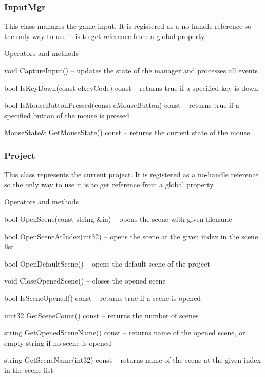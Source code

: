 \subsubsection{InputMgr}

This class manages the game input. It is registered as a no-handle reference so the only way to use it is to get reference from a global property.

\begin{titled-itemize}{Operators and methods}
  \item void CaptureInput() -- updates the state of the manager and processes all events
  \item bool IsKeyDown(const eKeyCode) const -- returns true if a specified key is down
  \item bool IsMouseButtonPressed(const eMouseButton) const -- returns true if a specified button of the mouse is pressed
  \item MouseState\& GetMouseState() const -- returns the current state of the mouse
\end{titled-itemize}

\subsubsection{Project}

This class represents the current project. It is registered as a no-handle reference so the only way to use it is to get reference from a global property.

\begin{titled-itemize}{Operators and methods}
  \item bool OpenScene(const string \&in) -- opens the scene with given filename
  \item bool OpenSceneAtIndex(int32) -- opens the scene at the given index in the scene list
  \item bool OpenDefaultScene() -- opens the default scene of the project
  \item void CloseOpenedScene() -- closes the opened scene
  \item bool IsSceneOpened() const -- returns true if a scene is opened
  \item uint32 GetSceneCount() const -- returns the number of scenes
  \item string GetOpenedSceneName() const -- returns name of the opened scene, or empty string if no scene is opened
  \item string GetSceneName(int32) const -- returns name of the scene at the given index in the scene list
\end{titled-itemize}

